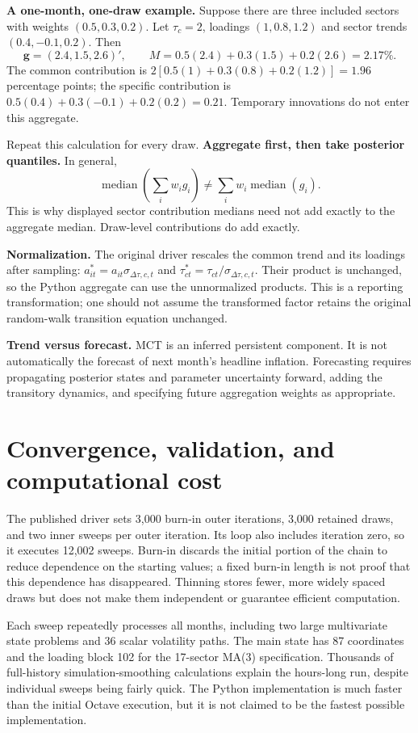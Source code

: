 \documentclass[11pt,a4paper]{article}
\begin{document}
\textbf{A one-month, one-draw example.} Suppose there are three included sectors with weights $(0.5,0.3,0.2)$. Let $\tau_c=2$, loadings $(1,0.8,1.2)$ and sector trends $(0.4,-0.1,0.2)$. Then
\[
\mathbf g=(2.4,1.5,2.6)',\qquad
M=0.5(2.4)+0.3(1.5)+0.2(2.6)=2.17\%.
\]
The common contribution is $2[0.5(1)+0.3(0.8)+0.2(1.2)]=1.96$ percentage points; the specific contribution is $0.5(0.4)+0.3(-0.1)+0.2(0.2)=0.21$. Temporary innovations do not enter this aggregate.

Repeat this calculation for every draw. \textbf{Aggregate first, then take posterior quantiles.} In general,
\[
\operatorname{median}\!\left(\sum_i w_i g_i\right)
\ne \sum_i w_i\operatorname{median}(g_i).
\]
This is why displayed sector contribution medians need not add exactly to the aggregate median. Draw-level contributions do add exactly.

\textbf{Normalization.} The original driver rescales the common trend and its loadings after sampling: $a_{it}^*=a_{it}\sigma_{\Delta\tau,c,t}$ and $\tau_{ct}^*=\tau_{ct}/\sigma_{\Delta\tau,c,t}$. Their product is unchanged, so the Python aggregate can use the unnormalized products. This is a reporting transformation; one should not assume the transformed factor retains the original random-walk transition equation unchanged.

\textbf{Trend versus forecast.} MCT is an inferred persistent component. It is not automatically the forecast of next month's headline inflation. Forecasting requires propagating posterior states and parameter uncertainty forward, adding the transitory dynamics, and specifying future aggregation weights as appropriate.

\newpage
\section{Convergence, validation, and computational cost}
The published driver sets 3,000 burn-in outer iterations, 3,000 retained draws, and two inner sweeps per outer iteration. Its loop also includes iteration zero, so it executes 12,002 sweeps. Burn-in discards the initial portion of the chain to reduce dependence on the starting values; a fixed burn-in length is not proof that this dependence has disappeared. Thinning stores fewer, more widely spaced draws but does not make them independent or guarantee efficient computation.

Each sweep repeatedly processes all months, including two large multivariate state problems and 36 scalar volatility paths. The main state has 87 coordinates and the loading block 102 for the 17-sector MA(3) specification. Thousands of full-history simulation-smoothing calculations explain the hours-long run, despite individual sweeps being fairly quick. The Python implementation is much faster than the initial Octave execution, but it is not claimed to be the fastest possible implementation.
\end{document}
